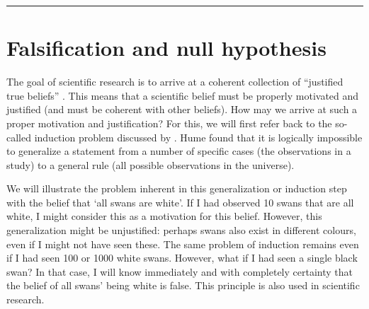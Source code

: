 \documentclass[
]{book}
\begin{document}
\begin{center}\rule{0.5\linewidth}{0.5pt}\end{center}

\hypertarget{sec:falsification}{%
\section{Falsification and null hypothesis}\label{sec:falsification}}

The goal of scientific research is to arrive at a coherent collection of ``justified true beliefs'' \citep{Mort03}. This means that a scientific belief must be properly motivated and justified (and must be coherent with other beliefs). How may we arrive at such a proper motivation and justification? For this, we will first refer back to the so-called induction problem discussed by \citet{Hume1739}. Hume found that it is logically impossible to generalize a statement from a number of specific cases (the observations in a study) to a general rule (all possible observations in the universe).

We will illustrate the problem inherent in this generalization or induction step with the belief that `all swans are white'. If I had observed 10 swans that are all white, I might consider this as a motivation for this belief. However, this generalization might be unjustified: perhaps swans also exist in different colours, even if I might not have seen these. The same problem of induction remains even if I had seen 100 or 1000 white swans. However, what if I had seen a single black swan? In that case, I will know immediately and with completely certainty that the belief of all swans' being white is false. This principle is also used in scientific research.
\end{document}

